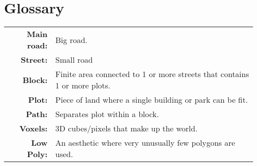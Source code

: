 \section*{Glossary}

\begin{table}[h!]
    \centering
    \begin{tabular}{rl}
        \textbf{Main road:} & Big road.                                                                 \\
        \textbf{Street:}    & Small road                                                                \\
        \textbf{Block:}     & Finite area connected to 1 or more streets that contains 1 or more plots. \\
        \textbf{Plot:}      & Piece of land where a single building or park can be fit.                 \\
        \textbf{Path:}      & Separates plot within a block.                                            \\
        \textbf{Voxels:}    & 3D cubes/pixels that make up the world.                                   \\
        \textbf{Low Poly:}  & An aesthetic where very unusually few polygons are used.                 
    \end{tabular}
\end{table}